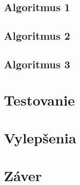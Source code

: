\documentclass[a4paper,11pt,final]{report}
\begin{document}
\section{Algoritmus 1}
\section{Algoritmus 2}
\section{Algoritmus 3}
\chapter{Testovanie}
\chapter{Vylepšenia}
\chapter{Záver}
\newpage
{}
\begin{thebibliography}{blablablabla}
\end{thebibliography}
\end{document}
